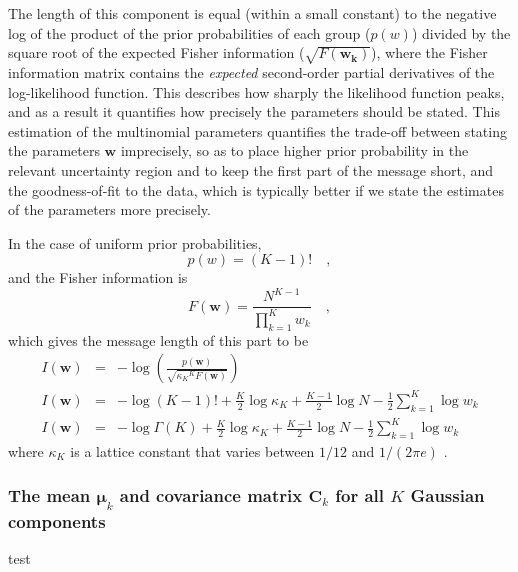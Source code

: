 \documentclass{elsarticle}
\newcommand{\vect}[1]{\boldsymbol{\mathbf{#1}}}
\renewcommand{\vec}[1]{\vect{#1}}
\def\veccov{\vect{C}}
\def\vecmean{\vect{\mu}}
\def\weight{w}
\def\weights{\vect{\weight}}
\newcommand{\prior}[1]{p\left(#1\right)}
\begin{document}
The length of this component is equal (within a small constant) to the 
negative log of the product of the prior probabilities of each group 
($\prior{w}$) divided by the square root of the expected Fisher information
($\sqrt{F(\vec{w_k})}$), where the Fisher information matrix contains the
\emph{expected} second-order partial derivatives of the log-likelihood
function. This describes how sharply the likelihood function peaks, and as a
result it quantifies how precisely the parameters should be stated. This
estimation of the multinomial parameters quantifies the trade-off between
stating the parameters $\vec{\weights}$ imprecisely, so as to place higher
prior probability in the relevant uncertainty region and to keep the first
part of the message short, and the goodness-of-fit to the data, which is
typically better if we state the estimates of the parameters more precisely.

\noindent{}In the case of uniform prior probabilities,
\begin{equation}
    \prior{w} = (K - 1)! \quad ,
\end{equation}
\noindent{}and the Fisher information is
\begin{equation}
F(\vec{w}) = \frac{N^{K - 1}}{\prod_{k=1}^{K} w_k} \quad ,
\end{equation}
\noindent{}which gives the message length of this part to be
\begin{eqnarray}
I(\vec{w}) &=& -\log\left(\frac{\prior{\vec{w}}}{\sqrt{{\kappa_K}^K F(\vec{w})}}\right)  \nonumber \\
I(\vec{w}) &=& -\log{(K - 1)!} + \frac{K}{2}\log{\kappa_K} + \frac{K-1}{2}\log{N} - \frac{1}{2}\sum_{k=1}^{K}\log{\weight_k} \nonumber \\
I(\vec{w}) &=& -\log{\Gamma(K)} + \frac{K}{2}\log{\kappa_K} + \frac{K-1}{2}\log{N} - \frac{1}{2}\sum_{k=1}^{K}\log{\weight_k}
\end{eqnarray}
\noindent{}where $\kappa_K$ is a lattice constant that varies between $1/12$
and $1/(2\pi e)$ \cite{BoultonWallace1969}.



\subsubsection{The mean $\vecmean_k$ and covariance matrix $\veccov_k$ for all
               $K$ Gaussian components}
test

\end{document}
